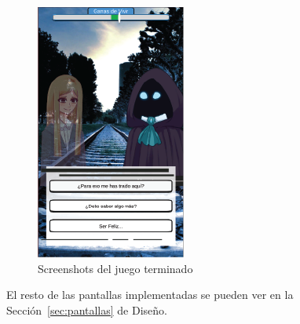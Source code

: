 \begin{figure}[h]
\begin{minipage}{.24\textwidth}
        \includegraphics[width=\textwidth]{imgs/screenshot-final3.png}
    \end{minipage}
    \caption{Screenshots del juego terminado}
    \label{fig:screenshots-terminado}
\end{figure}

El resto de las pantallas implementadas se pueden ver en la Sección~\ref{sec:pantallas} de Diseño.



